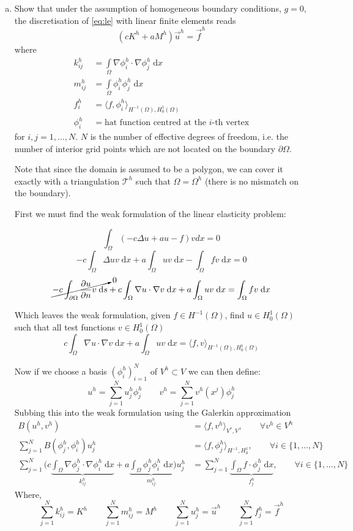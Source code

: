 \documentclass[10pt,letterpaper]{scrartcl}
\newcommand{\dx}{\;\mathrm{d}x}
\newcommand{\ds}{\;\mathrm{d}s}
\begin{document}
\begin{enumerate}[(a)]
\item Show that under the assumption of homogeneous boundary conditions, $g=0$, the discretisation of \eqref{eq:le} with linear finite elements reads
\begin{equation*}
(cK^h + aM^h) \vec{u}^h = \vec{f}^h
\end{equation*}
where
\begin{align*}
k_{ij}^h &= \int\limits_\Omega \nabla \phi_i^h \cdot \nabla \phi_j^h \dx\\
m_{ij}^h &= \int\limits_\Omega \phi_i^h \phi_j^h \dx\\
f_{i}^h &= \langle f, \phi_i^h\rangle_{H^{-1}(\Omega),H^1_0(\Omega)}\\
\phi_i^h &= \text{hat function centred at the $i$-th vertex}
\end{align*}
for $i,j = 1,\dots ,N$. $N$ is the number of effective degrees of freedom, i.e. the number of interior grid points which are not located on the boundary $\partial\Omega$.

Note that since the domain is assumed to be a polygon, we can cover it exactly with a triangulation $\mathcal{T}^h$ such that $\Omega = \Omega^h$ (there is no mismatch on the boundary).


\bigskip
First we must find the weak formulation of the linear elasticity problem:

    \[\int_\Omega (-c\Delta u + au - f)vdx = 0\]
    \[-c\int_\Omega \Delta uv \dx + a\int_\Omega uv\dx - \int_\Omega fv\dx = 0\]
    \[\cancelto{0}{-c\int_{\partial\Omega} \frac{\partial u}{\partial n}v \ds} + c\int_\Omega \nabla u \cdot \nabla v\dx + a\int_\Omega uv\dx = \int_\Omega fv\dx\]

Which leaves the weak formulation, given $f \in H^{-1}(\Omega)$, find $u \in H_0^1(\Omega)$ such that all test functions $v \in H_0^1(\Omega)$
\[c\int_\Omega \nabla u \cdot \nabla v \dx + a\int_\Omega uv\dx = \langle f, v\rangle_{H^{-1}(\Omega),H^1_0(\Omega)}\]

\newpage
Now if we choose a basis $(\phi_i^h)_{i=1}^N$ of $V^h \subset V$ we can then define:
\[u^h = \sum_{j=1}^N u_j^h\phi_j^h \qquad v^h = \sum_{j=1}^N v^h(x^j)\phi_j^h\]
Subbing this into the weak formulation using the Galerkin approximation
\begin{align*}
    B(u^h, v^h) &= \langle f, v^h \rangle_{V^*, V},\qquad \forall v^h \in V^h \\
    \sum_{j=1}^N B(\phi_j^h, \phi_i^h) u_j^h &= \langle f, \phi_j^h \rangle_{H^{-1},H_0^1},\qquad \forall i \in \{1,\dotso,N\} \\
    \sum_{j=1}^N \Big( c\underbrace{\int_\Omega \nabla \phi_j^h \cdot \nabla \phi_i^h \dx}_{k_{ij}^h} + a \underbrace{\int_\Omega \phi_j^h\phi_i^h\dx}_{m_{ij}^h} \Big) u_j^h &= \sum_{j=1}^N \underbrace{\int_\Omega f \cdot \phi_j^h \dx}_{f_j^h} , \qquad \forall i \in \{1,\dotso,N\}
\end{align*}
Where,
\[\sum_{j=1}^N k_{ij}^h = K^h \qquad \sum_{j=1}^N m_{ij}^h = M^h \qquad \sum_{j=1}^N u_j^h = \vec{u}^h \qquad \sum_{j=1}^N f_j^h = \vec{f}^h\]


\end{enumerate}
\end{document}
